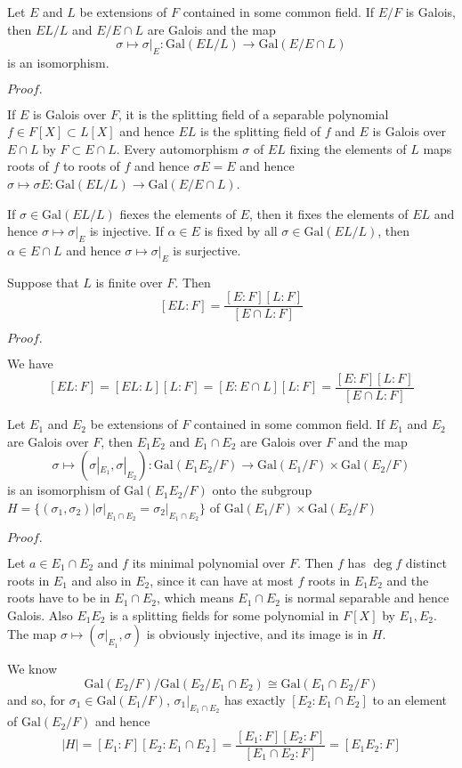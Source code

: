 \documentclass{article}
\newcommand{\Pf}[1]{$Proof.$\par}
\begin{document}
\begin{proposition}
    Let $E$ and $L$ be extensions of $F$ contained in some common field. If $E/F$ is Galois, then $EL/L$ and $E/E\cap L$ are Galois and the map
    \[
    \sigma\mapsto \sigma|_E:\text{Gal}(EL/L) \to \text{Gal}(E/E\cap L)
    \]
    is an isomorphism.
\end{proposition}
\Pf\par
    If $E$ is Galois over $F$, it is the splitting field of a separable polynomial $f\in F[X] \subset L[X]$ and hence $EL$ is the splitting field of $f$ and $E$ is Galois over $E\cap L$ by $F\subset E\cap L$. Every automorphism $\sigma$ of $EL$ fixing the elements of $L$ maps roots of $f$ to roots of $f$ and hence $\sigma E = E$ and hence $\sigma\mapsto \sigma E: \text{Gal}(EL/L) \to \text{Gal}(E/E\cap L)$.\par
    If $\sigma \in \text{Gal}(EL/L)$ fiexes the elements of $E$, then it fixes the elements of $EL$ and hence $\sigma \mapsto \sigma|_E$ is injective. If $\alpha\in E$ is fixed by all $\sigma \in \text{Gal}(EL/L)$, then $\alpha \in E\cap L$ and hence $\sigma\mapsto \sigma|_E$ is surjective.

\begin{corollary}
    Suppose that $L$ is finite over $F$. Then
    \[
    [EL:F] = \dfrac{[E:F][L:F]}{[E\cap L :F]}
    \]
\end{corollary}
\Pf\par
    We have
    \[
    [EL:F] = [EL:L][L:F] = [E:E\cap  L][L:F] = \dfrac{[E:F][L:F]}{[E\cap L :F]}
    \]

\begin{proposition}
    Let $E_1$ and $E_2$ be extensions of $F$ contained in some common field. If $E_1$ and $E_2$ are Galois over $F$, then $E_1E_2$ and $E_1\cap E_2$ are Galois over $F$ and the map
    \[
    \sigma\mapsto (\sigma|_{E_1},\sigma|_{E_2}): \text{Gal}(E_1E_2/F) \to \text{Gal}(E_1/F)\times \text{Gal}(E_2/F)
    \]
    is an isomorphism of $\text{Gal}(E_1E_2/F)$ onto the subgroup $H = \{(\sigma_1,\sigma_2)| \sigma|_{E_1\cap E_2} = \sigma_2|_{E_1\cap E_2}\}$
    of $\text{Gal}(E_1/F) \times \text{Gal}(E_2/F)$
\end{proposition}
\Pf\par
    Let $a\in E_1\cap E_2$ and $f$ its minimal polynomial over $F$. Then $f$ has $\deg f$ distinct roots in $E_1$ and also in $E_2$, since it can have at most $f$ roots in $E_1E_2$ and the roots have to be in $E_1\cap E_2$, which means $E_1\cap E_2$ is normal separable and hence Galois. Also $E_1E_2$ is a splitting fields for some polynomial in $F[X]$ by $E_1,E_2$. The map $\sigma \mapsto (\sigma|_{E_1},\sigma)$ is obviously injective, and its image is in $H$.\par
    We know
    \[
    \text{Gal}(E_2/F)/\text{Gal}(E_2/E_1\cap E_2) \cong \text{Gal}(E_1\cap E_2/F)
    \]
    and so, for $\sigma_1\in \text{Gal}(E_1/F)$, $\sigma_1|_{E_1\cap E_2}$ has exactly $[E_2:E_1\cap E_2]$ to an element of $\text{Gal}(E_2/F)$ and hence
    \[
    |H| = [E_1:F][E_2:E_1\cap E_2] = \dfrac{[E_1:F][E_2:F]}{[E_1\cap E_2:F]} = [E_1E_2:F]
    \]
\end{document}
